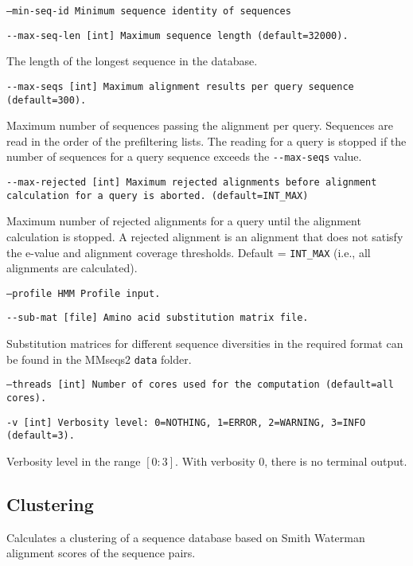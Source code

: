 \documentclass[11pt,a4paper]{scrreprt}
\begin{document}
\texttt{\small --min-seq-id Minimum sequence identity of sequences}{\small \par}

\texttt{\small -{}-max-seq-len {[}int{]} Maximum sequence length (default=32000).}{\small \par}

The length of the longest sequence in the database.

\texttt{\small -{}-max-seqs {[}int{]} Maximum alignment results per query sequence (default=300).}{\small \par}

Maximum number of sequences passing the alignment per query. Sequences are read in the order of the prefiltering lists. The reading for a query is stopped if the number of sequences for a query sequence exceeds the \texttt{-{}-max-seqs} value.

\texttt{\small -{}-max-rejected {[}int{]} Maximum rejected alignments before alignment calculation for a query is aborted. (default=INT\_MAX)}{\small \par}

Maximum number of rejected alignments for a query until the alignment calculation is stopped. A rejected alignment is an alignment that does not satisfy the e-value and alignment coverage thresholds. Default = \texttt{INT\_MAX} (i.e., all alignments are calculated).

\texttt{\small --profile HMM Profile input.}{\small \par}

\texttt{\small -{}-sub-mat {[}file{]} Amino acid substitution matrix file.}{\small \par}

Substitution matrices for different sequence diversities in the required format can be found in the MMseqs2 \texttt{data} folder.

\texttt{\small --threads {[}int{]} Number of cores used for the computation (default=all cores).}{\small \par}

\texttt{\small -v {[}int{]} Verbosity level: 0=NOTHING, 1=ERROR, 2=WARNING, 3=INFO (default=3).}{\small \par}

Verbosity level in the range $[0:3]$. With verbosity $0$, there is no terminal output.
\subsection{Clustering}
Calculates a clustering of a sequence database based on Smith Waterman alignment scores of the sequence pairs.
\end{document}

